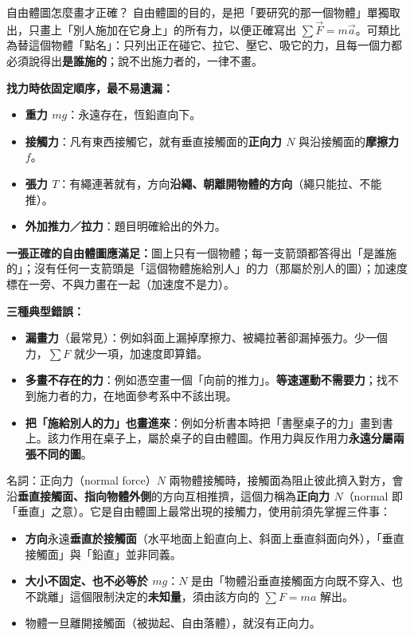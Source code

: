 \documentclass[11pt]{article}
\begin{document}
\begin{補充框}{自由體圖怎麼畫才正確？}
自由體圖的目的，是把「要研究的那一個物體」單獨取出，只畫上「別人施加在它身上」的所有力，以便正確寫出 $\sum\vec F=m\vec a$。可類比為替這個物體「點名」：只列出正在碰它、拉它、壓它、吸它的力，且每一個力都必須說得出\textbf{是誰施的}；說不出施力者的，一律不畫。

\textbf{找力時依固定順序，最不易遺漏：}
\begin{itemize}\setlength{\itemsep}{1pt}
\item \textbf{重力 $mg$}：永遠存在，恆鉛直向下。
\item \textbf{接觸力}：凡有東西接觸它，就有垂直接觸面的\textbf{正向力 $N$} 與沿接觸面的\textbf{摩擦力 $f$}。
\item \textbf{張力 $T$}：有繩連著就有，方向\textbf{沿繩、朝離開物體的方向}（繩只能拉、不能推）。
\item \textbf{外加推力／拉力}：題目明確給出的外力。
\end{itemize}

\textbf{一張正確的自由體圖應滿足：}圖上只有一個物體；每一支箭頭都答得出「是誰施的」；沒有任何一支箭頭是「這個物體施給別人」的力（那屬於別人的圖）；加速度標在一旁、不與力畫在一起（加速度不是力）。

\textbf{三種典型錯誤：}
\begin{itemize}\setlength{\itemsep}{1pt}
\item \textbf{漏畫力}（最常見）：例如斜面上漏掉摩擦力、被繩拉著卻漏掉張力。少一個力，$\sum F$ 就少一項，加速度即算錯。
\item \textbf{多畫不存在的力}：例如憑空畫一個「向前的推力」。\textbf{等速運動不需要力}；找不到施力者的力，在地面參考系中不該出現。
\item \textbf{把「施給別人的力」也畫進來}：例如分析書本時把「書壓桌子的力」畫到書上。該力作用在桌子上，屬於桌子的自由體圖。作用力與反作用力\textbf{永遠分屬兩張不同的圖}。
\end{itemize}
\end{補充框}

\begin{補充框}{名詞：正向力（normal force）$N$}
兩物體接觸時，接觸面為阻止彼此擠入對方，會沿\textbf{垂直接觸面、指向物體外側}的方向互相推擠，這個力稱為\textbf{正向力 $N$}（normal 即「垂直」之意）。它是自由體圖上最常出現的接觸力，使用前須先掌握三件事：
\begin{itemize}\setlength{\itemsep}{1pt}
\item \textbf{方向}永遠\textbf{垂直於接觸面}（水平地面上鉛直向上、斜面上垂直斜面向外），「垂直接觸面」與「鉛直」並非同義。
\item \textbf{大小不固定、也不必等於 $mg$}：$N$ 是由「物體沿垂直接觸面方向既不穿入、也不跳離」這個限制決定的\textbf{未知量}，須由該方向的 $\sum F=ma$ 解出。
\item 物體一旦離開接觸面（被拋起、自由落體），就沒有正向力。
\end{itemize}
\end{補充框}
\end{document}

